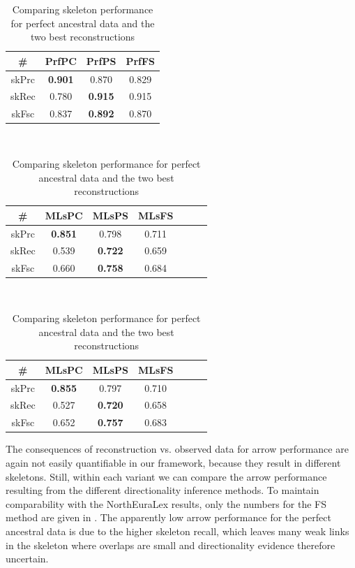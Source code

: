 \begin{table}
 \centering
  \begin{tabular}{cccc}
  \hline \hline
  \# & PrfPC & PrfPS & PrfFS\\ \hline
  skPrc & \textbf{0.901} & 0.870 & 0.829\\
  skRec & 0.780 & \textbf{0.915} & 0.915\\
  skFsc & 0.837 & \textbf{0.892} & 0.870\\
  \hline
 \end{tabular}\\[0.5cm]
 \begin{tabular}{ccccccc}
  \hline \hline
  \# & MLsPC & MLsPS & MLsFS\\ \hline
  skPrc & \textbf{0.851} & 0.798 & 0.711\\
  skRec & 0.539 & \textbf{0.722} & 0.659\\
  skFsc & 0.660 & \textbf{0.758} & 0.684\\
  \hline
 \end{tabular}\\[0.5cm]
\begin{tabular}{ccccccc}
  \hline \hline
  \# & MLsPC & MLsPS & MLsFS\\ \hline
  skPrc & \textbf{0.855} & 0.797 & 0.710\\
  skRec & 0.527 & \textbf{0.720} & 0.658\\
  skFsc & 0.652 & \textbf{0.757} & 0.683\\
  \hline
 \end{tabular}
 \caption{Comparing skeleton performance for perfect ancestral data and the two best reconstructions}
 \label{perfect-vs-reconstruction-skeleton}
\end{table}

The consequences of reconstruction vs. observed data for arrow performance are again not easily quantifiable in our framework, because they result in different skeletons. Still, within each variant we can compare the arrow performance resulting from the different directionality inference methods. To maintain comparability with the NorthEuraLex results, only the numbers for the FS method are given in . The apparently low arrow performance for the perfect ancestral data is due to the higher skeleton recall, which leaves many weak links in the skeleton where overlaps are small and directionality evidence therefore uncertain.

